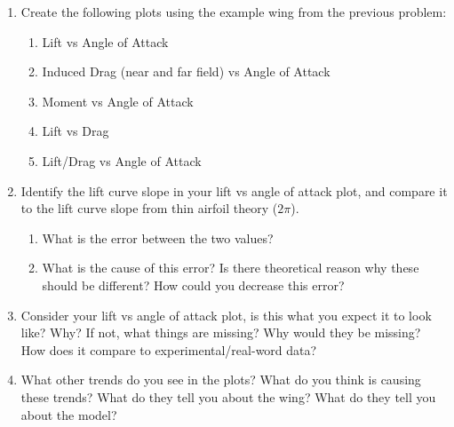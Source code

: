 \documentclass[11pt]{article}
\begin{document}
\begin{enumerate}[label=\roman*.]
	\item Create the following plots using the example wing from the previous problem:
	\begin{enumerate}
		\item Lift vs Angle of Attack
		\item Induced Drag (near and far field) vs Angle of Attack
		\item Moment vs Angle of Attack
		\item Lift vs Drag
		\item Lift/Drag vs Angle of Attack
	\end{enumerate}
	\item Identify the lift curve slope in your lift vs angle of attack plot, and compare it to the lift curve slope from thin airfoil theory (\(2\pi\)).
	\begin{enumerate}
		\item What is the error between the two values?
		\item What is the cause of this error? Is there theoretical reason why these should be different? How could you decrease this error? 
	\end{enumerate}
	\item Consider your lift vs angle of attack plot, is this what you expect it to look like? Why? If not, what things are missing? Why would they be missing? How does it compare to experimental/real-word data?
	\item What other trends do you see in the plots? What do you think is causing these trends? What do they tell you about the wing? What do they tell you about the model? 
\end{enumerate}
\end{document}
